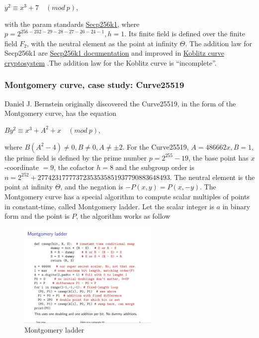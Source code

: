 \begin{center}
  $y^2 \equiv x^3 + 7 \quad (mod \ p)$,
\end{center}

with the param standards \href{https://en.bitcoin.it/wiki/Secp256k1}{Secp256k1}, where $p = 2^{256 - 232 - 29 - 28 - 27 - 26 - 24 - 1}, h = 1$. Its finite field is defined over the finite field $F_2$, with the neutral element as the point at infinity $\Theta$. The addition law for Secp256k1 are \href{https://www.researchgate.net/publication/332783847_Arithmetic_of_Koblitz_Curve_Secp256k1_Used_in_Bitcoin_Cryptocurrency_Based_on_One_Variable_Polynomial_Division}{Secp256k1 documentation} and improved in \href{https://www.researchgate.net/publication/223346975_Koblitz_curve_cryptosystems}{Koblitz curve cryptosystem} .The addition law for the Koblitz curve is “incomplete”.

\subsubsection{Montgomery curve, case study: Curve25519}
Daniel J. Bernstein originally discovered the Curve25519, in the form of the Montgomery curve, has the equation

\begin{center}
  $By^2 \equiv x^3 + A^2 + x \quad (mod \ p)$,
\end{center}

where $B(A^2-4) \neq 0, B \neq 0, A \neq \pm 2$. For the Curve25519, $A = 486662x, B = 1$, the prime field is defined by the prime number $p=2^{255}-19$, the base point has $x$-coordinate $= 9$,  the cofactor $h = 8$ and the subgroup order is $n = 2^{252} + 27742317777372353535851937790883648493$. The neutral element is the point at infinity $\Theta$, and the negation is $-P(x, y) = P(x, -y)$. The Montgomery curve has a special algorithm to compute scalar multiples of points in constant-time, called Montgomery ladder. Let the scalar integer is $a$ in binary form and the point is $P$, the algorithm works as follow

\begin{figure}[ht!]
  \centering
  \includegraphics[width=0.6\textwidth]{images/montgomery_ladder.png}
  \caption[Montgomery ladder]{Montgomery ladder}
  \label{fig:montgomery_ladder}
\end{figure}

